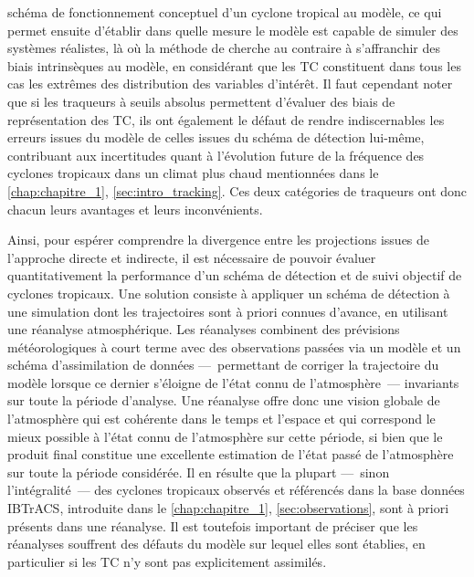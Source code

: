 \documentclass[../main.tex]{subfiles}
\begin{document}
schéma de fonctionnement conceptuel d'un cyclone tropical au modèle, ce qui permet ensuite d'établir dans quelle mesure le modèle est capable de simuler des
systèmes réalistes, là où la méthode de \textcite{camargo_improving_2002} cherche au contraire à s'affranchir des biais intrinsèques au modèle, en considérant
que les TC constituent dans tous les cas les extrêmes des distribution des variables d'intérêt. Il faut cependant noter que si les traqueurs à seuils absolus
permettent d'évaluer des biais de représentation des TC, ils ont également le défaut de rendre indiscernables les erreurs issues du modèle de celles issues du
schéma de détection lui-même, contribuant aux incertitudes quant à l'évolution future de la fréquence des cyclones tropicaux dans un climat plus chaud
mentionnées dans le \cref{chap:chapitre_1}, \cref{sec:intro_tracking}. Ces deux catégories de traqueurs ont donc chacun leurs avantages et leurs inconvénients.

Ainsi, pour espérer comprendre la divergence entre les projections issues de l'approche directe et indirecte, il est nécessaire de pouvoir évaluer
quantitativement la performance d'un schéma de détection et de suivi objectif de cyclones tropicaux. Une solution consiste à appliquer un schéma de détection à
une simulation dont les trajectoires sont à priori connues d'avance, en utilisant une réanalyse atmosphérique. Les réanalyses combinent des prévisions
météorologiques à court terme avec des observations passées via un modèle et un schéma d'assimilation de données ---~permettant de corriger la trajectoire du
modèle lorsque ce dernier s'éloigne de l'état connu de l'atmosphère~--- invariants sur toute la période d'analyse. Une réanalyse offre donc une vision globale
de l'atmosphère qui est cohérente dans le temps et l'espace et qui correspond le mieux possible à l'état connu de l'atmosphère sur cette période, si bien que le
produit final constitue une excellente estimation de l'état passé de l'atmosphère sur toute la période considérée. Il en résulte que la plupart ---~sinon
l'intégralité~--- des cyclones tropicaux observés et référencés dans la base données IBTrACS, introduite dans le \cref{chap:chapitre_1},
\cref{sec:observations}, sont à priori présents dans une réanalyse. Il est toutefois important de préciser que les réanalyses souffrent des défauts du modèle
sur lequel elles sont établies, en particulier si les TC n'y sont pas explicitement assimilés.
\end{document}
